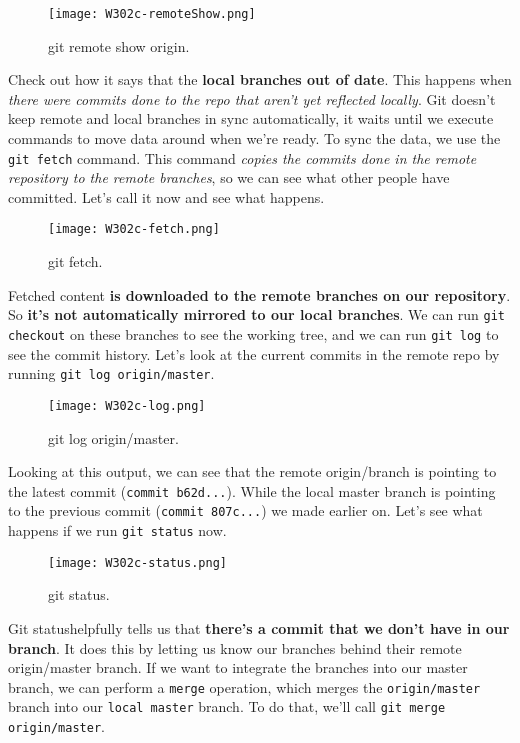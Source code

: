 \begin{figure} 
	\caption{git remote show origin.}
	\centering
	\texttt{[image: W302c-remoteShow.png]}
	\label{W302c-remoteShow}
\end{figure}


Check out how it says that the \textbf{local branches out of date}. This happens when\textit{ there were commits done to the repo that aren't yet reflected locally}. Git doesn't keep remote and local branches in sync automatically, it waits until we execute commands to move data around when we're ready. To sync the data, we use the \verb|git fetch| command. This command \textit{copies the commits done in the remote repository to the remote branches}, so we can see what other people have committed. Let's call it now and see what happens.

\begin{figure} 
	\caption{git fetch.}
	\centering
	\texttt{[image: W302c-fetch.png]}
	\label{W302c-fetch}
\end{figure}

Fetched content\textbf{ is downloaded to the remote branches on our repository}. So \textbf{it's not automatically mirrored to our local branches}. We can run \verb|git checkout| on these branches to see the working tree, and we can run \verb|git log| to see the commit history. Let's look at the current commits in the remote repo by running \verb|git log origin/master|.

\begin{figure} 
	\caption{git log origin/master.}
	\centering
	\texttt{[image: W302c-log.png]}
	\label{W302c-log}
\end{figure}

Looking at this output, we can see that the remote origin/branch is pointing to the latest commit (\verb|commit b62d...|). While the local master branch is pointing to the previous commit (\verb|commit 807c...|) we made earlier on. Let's see what happens if we run \verb|git status| now. 

\begin{figure} 
	\caption{git status.}
	\centering
	\texttt{[image: W302c-status.png]}
	\label{W302c-status}
\end{figure}

Git statushelpfully tells us that \textbf{there's a commit that we don't have in our branch}. It does this by letting us know our branches behind their remote origin/master branch. If we want to integrate the branches into our master branch, we can perform a \verb|merge| operation, which merges the \verb|origin/master| branch into our \verb|local master| branch. To do that, we'll call \verb|git merge origin/master|.

